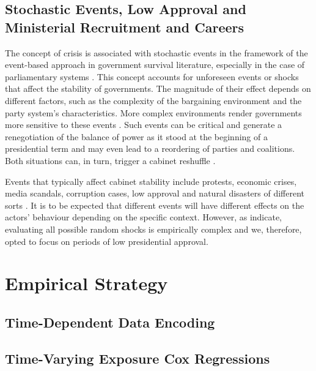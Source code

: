 \documentclass[12pt,halfline,a4paper]{ouparticle}
\begin{document}
\subsection{Stochastic Events, Low Approval and Ministerial Recruitment and Careers}
\label{sec2.1}

The concept of crisis is associated with stochastic events in the framework of the event-based approach in government survival literature, especially in the case of parliamentary systems \citep{Browne1986, Fortunato2018, King1990, Warwick1994}. This concept accounts for unforeseen events or shocks that affect the stability of governments. The magnitude of their effect depends on different factors, such as the complexity of the bargaining environment and the party system’s characteristics. More complex environments render governments more sensitive to these events \citep{Chiba2015, Laver1996, Laver1990}. Such events can be critical and generate a renegotiation of the balance of power as it stood at the beginning of a presidential term and may even lead to a reordering of parties and coalitions. Both situations can, in turn, trigger a cabinet reshuffle \citep{MartinezGallardo2012}.

Events that typically affect cabinet stability include protests, economic crises, media scandals, corruption cases, low approval and natural disasters of different sorts \citep{Camerlo2015a, MartinezGallardo2014}. It is to be expected that different events will have different effects on the actors’ behaviour depending on the specific context. However, as \cite{Berlinski2010} indicate, evaluating all possible random shocks is empirically complex and we, therefore, opted to focus on periods of low presidential approval. 

\section{Empirical Strategy}
\label{sec3}

\subsection{Time-Dependent Data Encoding}
\label{sec3.1}

\subsection{Time-Varying Exposure Cox Regressions}
\label{sec3.2}



\end{document}
